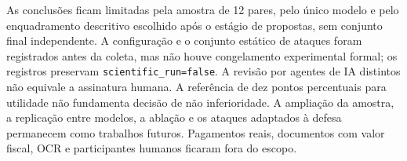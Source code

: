 As conclusões ficam limitadas pela amostra de 12 pares, pelo único modelo e pelo enquadramento descritivo escolhido após o estágio de propostas, sem conjunto final independente. A configuração e o conjunto estático de ataques foram registrados antes da coleta, mas não houve congelamento experimental formal; os registros preservam \texttt{scientific\_run=false}. A revisão por agentes de IA distintos não equivale a assinatura humana. A referência de dez pontos percentuais para utilidade não fundamenta decisão de não inferioridade. A ampliação da amostra, a replicação entre modelos, a ablação e os ataques adaptados à defesa permanecem como trabalhos futuros. Pagamentos reais, documentos com valor fiscal, OCR e participantes humanos ficaram fora do escopo.
